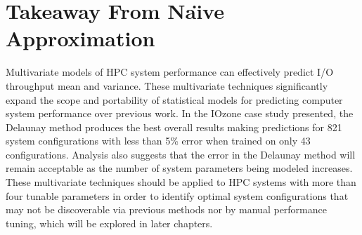 \vspace{-10pt}
\section{Takeaway From Na\"{\i}ve Approximation}
\label{sec:conclusion}

Multivariate models of HPC system performance can effectively predict
I/O throughput mean and variance. These multivariate techniques
significantly expand the scope and portability of statistical models
for predicting computer system performance over previous work. In the
IOzone case study presented, the Delaunay method produces the best
overall results making predictions for 821 system configurations with
less than 5\% error when trained on only 43 configurations. Analysis
also suggests that the error in the Delaunay method will remain
acceptable as the number of system parameters being modeled
increases. These multivariate techniques should be applied to HPC
systems with more than four tunable parameters in order to identify
optimal system configurations that may not be discoverable via
previous methods nor by manual performance tuning, which will be
explored in later chapters.
